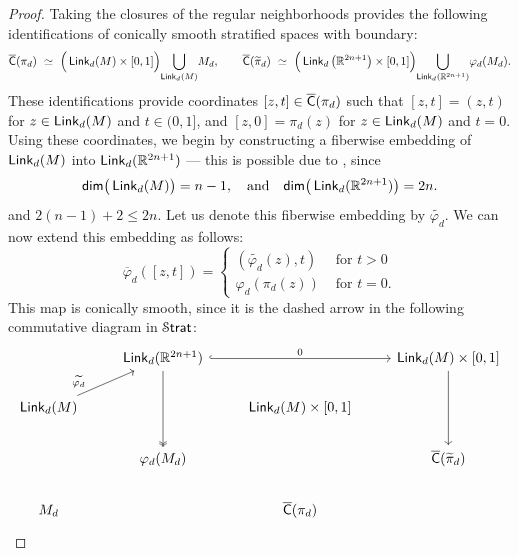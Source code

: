 \begin{proof}
    Taking the closures of the regular neighborhoods provides the following identifications of conically smooth stratified spaces with boundary:
    \begin{equation}
        \label{eq:ch7::regular neighborhood}
        \overline{\mathsf C}(\pi_d) ~\simeq~ \Big(\operatorname{\sf Link}_{d}(M) \times [0,1] \Big)\underset{\operatorname{\sf Link}_d(M)}{\bigcup} M_d, \qquad \overline{\mathsf C}(\widetilde{\pi}_d) ~\simeq~ \Big(\operatorname{\sf Link}_{d}\big(\mathbb R^{2n+1}\big) \times [0,1] \Big) \underset{\operatorname{\sf Link}_d(\mathbb R^{2n+1})}{\bigcup} \varphi_d(M_d).
    \end{equation}
    These identifications provide coordinates $[z,t]\in \overline{\mathsf C}(\pi_d)$ such that $[z,t] = (z,t)$ for $z\in \operatorname{\sf Link}_d(M)$ and $t\in (0,1]$, and $[z,0] = \pi_d(z)$ for $z\in\operatorname{\sf Link}_d(M)$ and $t=0$. Using these coordinates, we begin by constructing a fiberwise embedding of $\operatorname{\sf Link}_d(M)$ into $\operatorname{\sf Link}_d(\mathbb R^{2n+1})$ — this is possible due to , since 
    \begin{equation}
        \mathsf{dim}\big(\operatorname{\sf Link}_{d}(M)\big) = n - 1, \quad \text{and} \quad \mathsf{dim}\big(\operatorname{\sf Link}_{d}(\mathbb R^{2n+1})\big) = 2n.
    \end{equation} and $2(n-1)+2 \leq 2n$.
    Let us denote this fiberwise embedding by $\widetilde{\varphi_d}$. We can now extend this embedding as follows:
    \begin{equation}
        \overline{\varphi}_d([z,t]) = 
        \begin{cases}
            (\widetilde{\varphi_d}(z),t) & \text{ for } t>0 \\
            \varphi_d(\pi_d(z)) & \text{ for } t = 0.
        \end{cases}
    \end{equation} 
    This map is conically smooth, since it is the dashed arrow in the following commutative diagram in $\operatorname{\mathcal S\mathsf{trat}}$:
    \begin{equation}
    \begin{tikzcd}[ampersand replacement=\&]
        \& {\Link_d(\RR^{2n+1})} \&\& {\Link_d(M)\times [0,1]} \\
        {\Link_d(M)} \& {} \& {\Link_d(M)\times [0,1]} \\
        \& {\varphi_d(M_d)} \&\& {\overline{\sC}(\widetilde{\pi}_d)} \\
        {M_d} \&\& {\overline{\sC}(\pi_d)}
        \arrow[""{name=0, anchor=center, inner sep=0}, "0", hook, from=1-2, to=1-4]
        \arrow[two heads, from=1-2, to=3-2]
        \arrow[from=1-4, to=3-4]
        \arrow["{\widetilde{\varphi_d}}"{pos=0.2}, from=2-1, to=1-2]

\end{tikzcd}
\end{equation}
\end{proof}
